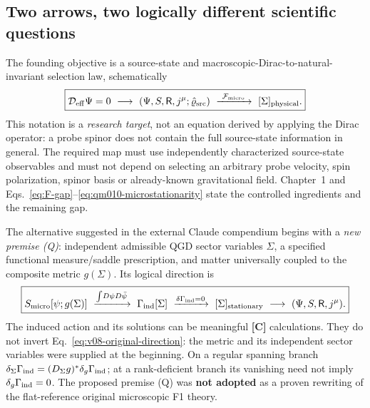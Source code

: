 \documentclass[11pt,a4paper]{article}
\begin{document}
\subsection{Two arrows, two logically different scientific questions}\label{sec:v08-two-arrows}
The founding objective is a source-state and macroscopic-Dirac-to-natural-invariant selection law, schematically
\begin{equation}\label{eq:v08-original-direction}
\boxed{\mathcal D_{\rm eff}\Psi=0\ \longrightarrow\ (\Psi,S,\mathsf R,j^\mu;\hat\varrho_{\rm src})
\ \xrightarrow{\ \mathcal F_{\rm micro}\ }\ [\Sigma]_{\rm physical}.}
\end{equation}
This notation is a \emph{research target}, not an equation derived by applying the Dirac operator: a probe spinor does not contain the full source-state information in general. The required map must use independently characterized source-state observables and must not depend on selecting an arbitrary probe velocity, spin polarization, spinor basis or already-known gravitational field. Chapter~1 and Eqs.~\eqref{eq:F-gap}--\eqref{eq:qm010-microstationarity} state the controlled ingredients and the remaining gap.

The alternative suggested in the external Claude compendium begins with a \emph{new premise (Q)}: independent admissible QGD sector variables $\Sigma$, a specified functional measure/saddle prescription, and matter universally coupled to the composite metric $g(\Sigma)$. Its logical direction is
\begin{equation}\label{eq:v08-induced-direction}
\boxed{S_{\rm micro}[\psi;g(\Sigma)]\ \xrightarrow{\int\! D\psi D\bar\psi}\
\Gamma_{\rm ind}[\Sigma]\ \xrightarrow{\delta\Gamma_{\rm ind}=0}\
[\Sigma]_{\rm stationary}\ \longrightarrow\ (\Psi,S,\mathsf R,j^\mu).}
\end{equation}
The induced action and its solutions can be meaningful \textbf{[C]} calculations. They do not invert Eq.~\eqref{eq:v08-original-direction}: the metric and its independent sector variables were supplied at the beginning. On a regular spanning branch $\delta_\Sigma\Gamma_{\rm ind}=(D_\Sigma g)^*\delta_g\Gamma_{\rm ind}$; at a rank-deficient branch its vanishing need not imply $\delta_g\Gamma_{\rm ind}=0$. The proposed premise (Q) was \textbf{not adopted} as a proven rewriting of the flat-reference original microscopic F1 theory.
\end{document}
